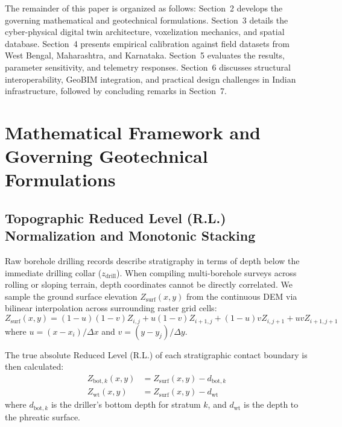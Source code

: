 \documentclass[11pt,a4paper]{article}
\begin{document}
The remainder of this paper is organized as follows: Section~2 develops the governing mathematical and geotechnical formulations. Section~3 details the cyber-physical digital twin architecture, voxelization mechanics, and spatial database. Section~4 presents empirical calibration against field datasets from West Bengal, Maharashtra, and Karnataka. Section~5 evaluates the results, parameter sensitivity, and telemetry responses. Section~6 discusses structural interoperability, GeoBIM integration, and practical design challenges in Indian infrastructure, followed by concluding remarks in Section~7.

\section{Mathematical Framework and Governing Geotechnical Formulations}

\subsection{Topographic Reduced Level (R.L.) Normalization and Monotonic Stacking}

Raw borehole drilling records describe stratigraphy in terms of depth below the immediate drilling collar ($z_{\text{drill}}$). When compiling multi-borehole surveys across rolling or sloping terrain, depth coordinates cannot be directly correlated. We sample the ground surface elevation $Z_{\text{surf}}(x, y)$ from the continuous DEM via bilinear interpolation across surrounding raster grid cells:
\begin{equation}
Z_{\text{surf}}(x, y) = (1 - u)(1 - v) Z_{i, j} + u(1 - v) Z_{i+1, j} + (1 - u)v Z_{i, j+1} + uv Z_{i+1, j+1}
\end{equation}
where $u = (x - x_i)/\Delta x$ and $v = (y - y_j)/\Delta y$. 

The true absolute Reduced Level (R.L.) of each stratigraphic contact boundary is then calculated:
\begin{align}
Z_{\text{bot}, k}(x, y) &= Z_{\text{surf}}(x, y) - d_{\text{bot}, k} \\
Z_{\text{wt}}(x, y) &= Z_{\text{surf}}(x, y) - d_{\text{wt}}
\end{align}
where $d_{\text{bot}, k}$ is the driller's bottom depth for stratum $k$, and $d_{\text{wt}}$ is the depth to the phreatic surface.
\end{document}
